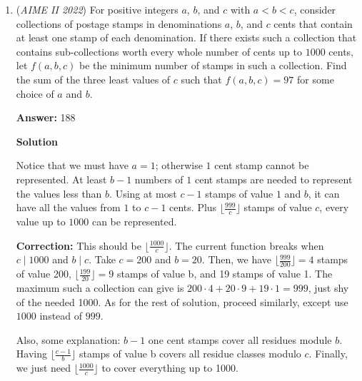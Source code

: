 \begin{enumerate}
 \begin{verbatim}
	$a \equiv 0 \pmod 2$ $b \equiv 0 \pmod 3$ $c \equiv 1 \pmod 5$ $d \equiv 3 \pmod7$.
\end{verbatim}

Now we put in $a=2x$, $b=3y$, $c=5z+1$ and $d=7w+3$ to get

 \begin{verbatim}
$2022 = 210(x+y+z+w) + 132$   $\Rightarrow \boxed{x+y+z+w=9},\; x,y,z,w\geq0$
\end{verbatim}

By stars-and-bars the answer is $\binom{9+4-1}{4-1} = \boxed{\textbf{220}}$.

 


	\item (\textit{AIME II 2022}) For positive integers $a$, $b$, and $c$ with $a < b < c$, consider collections of postage stamps in denominations $a$, $b$, and $c$ cents that contain at least one stamp of each denomination. If there exists such a collection that contains sub-collections worth every whole number of cents up to $1000$ cents, let $f(a, b, c)$ be the minimum number of stamps in such a collection. Find the sum of the three least values of $c$ such that $f(a, b, c) = 97$ for some choice of $a$ and $b$.


 
 \textbf{Answer: }188



\textbf{Solution}

Notice that we must have $a = 1$; otherwise $1$ cent stamp cannot be represented. At least $b-1$ numbers of $1$ cent stamps are needed to represent the values less than $b$. Using at most $c-1$ stamps of value $1$ and $b$, it can have all the values from $1$ to $c-1$ cents. Plus $\lfloor \frac{999}{c} \rfloor$ stamps of value $c$, every value up to $1000$ can be represented. 

 \textbf{Correction:} This should be $\lfloor \frac{1000}{c} \rfloor$. The current function breaks when $c \mid 1000$ and $b \mid c$. Take $c = 200$ and $b = 20$. Then, we have $\lfloor \frac{999}{200} \rfloor = 4$ stamps of value 200, $\lfloor \frac{199}{20} \rfloor = 9$ stamps of value b, and 19 stamps of value 1. The maximum such a collection can give is $200 \cdot 4 + 20 \cdot 9 +19 \cdot 1 = 999$, just shy of the needed 1000. As for the rest of solution, proceed similarly, except use $1000$ instead of $999$.

 Also, some explanation: $b-1$ one cent stamps cover all residues module $b$. Having $\lfloor \frac{c-1}{b} \rfloor$ stamps of value b covers all residue classes modulo $c$. Finally, we just need $\lfloor \frac{1000}{c} \rfloor$ to cover everything up to 1000.


\end{enumerate}
